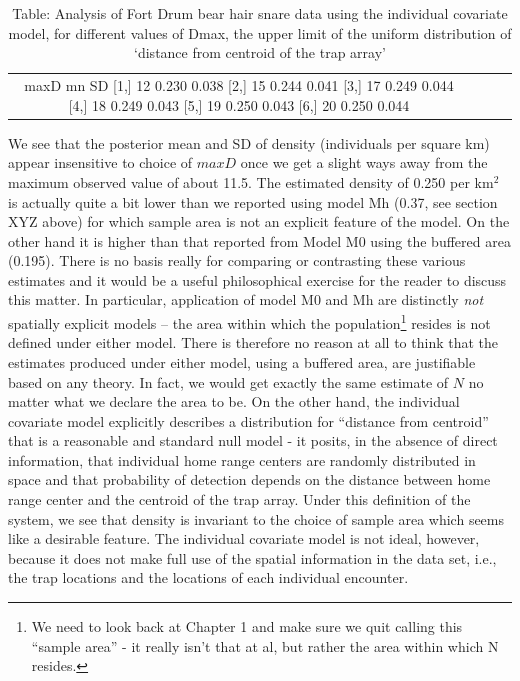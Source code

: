 \begin{table}
\caption{Table: Analysis of Fort Drum bear hair snare data using the individual covariate model, for different values of Dmax, the upper limit of the uniform distribution of `distance from centroid of the trap array' }
\begin{tabular}{cccc}
     maxD   mn    SD         
[1,]  12 0.230 0.038
[2,]  15 0.244 0.041
[3,]  17 0.249 0.044
[4,]  18 0.249 0.043
[5,]  19 0.250 0.043
[6,]  20 0.250 0.044
\end{tabular}
\end{table}


We see that the posterior mean and SD of density (individuals per square km) appear insensitive to choice of $maxD$ once we get a slight ways away from the maximum observed value of about 11.5. The estimated density of 0.250 per km$^2$ is actually quite a bit lower than we reported using model Mh (0.37, see section XYZ above) for which sample area is not an explicit feature of the model. On the other hand it is higher than that reported from Model M0 using the buffered area (0.195). There is no basis really for comparing or contrasting these various estimates and it would be a useful philosophical exercise for the reader to discuss this matter. In particular, application of model M0 and Mh are distinctly {\it not} spatially explicit models -- the area within which the population\footnote{We need to look back at Chapter 1 and make sure we quit calling this ``sample area'' - it really isn't that at al, but rather the area within which N resides.} resides is not defined under either model. There is therefore no reason at all to think that the estimates produced under either model, using a buffered area, are justifiable based on any theory. In fact, we would get exactly the same estimate of $N$ no matter what we declare the area to be. On the other hand, the individual covariate model explicitly describes a distribution for ``distance from centroid'' that is a reasonable and standard null model - it posits, in the absence of direct information, that individual home range centers are randomly distributed in space and that probability of detection depends on the distance between home range center and the centroid of the trap array. Under this definition of the system, we see that density is invariant to the choice of sample area which seems like a desirable feature. The individual covariate model is not ideal, however, because it does not make full use of the spatial information in the data set, i.e., the trap locations and the locations of each individual encounter. 


